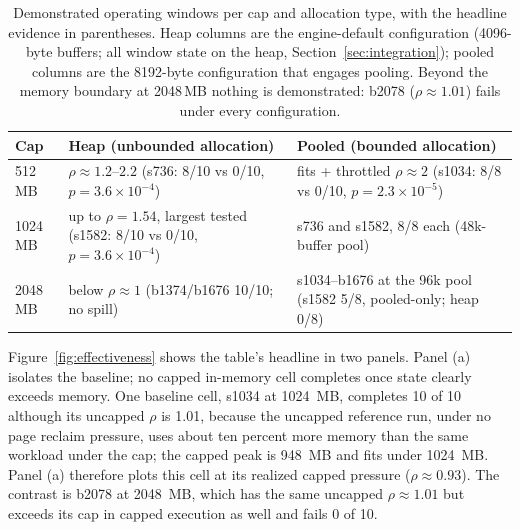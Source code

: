 \begin{table}[ht]
\centering
\small
\begin{tabular}{|p{1.5cm}|>{\raggedright\arraybackslash}p{5.1cm}|>{\raggedright\arraybackslash}p{5.1cm}|}
\hline
\textbf{Cap} & \textbf{Heap (unbounded allocation)} & \textbf{Pooled (bounded allocation)} \\
\hline
512\,MB  & $\rho \approx 1.2$--$2.2$ \newline (s736: 8/10 vs 0/10, $p=3.6\times10^{-4}$) & fits + throttled $\rho\approx2$ \newline (s1034: 8/8 vs 0/10, $p=2.3\times10^{-5}$) \\
\hline
1024\,MB & up to $\rho = 1.54$, largest tested \newline (s1582: 8/10 vs 0/10, $p=3.6\times10^{-4}$) & s736 and s1582, 8/8 each \newline (48k-buffer pool) \\
\hline
2048\,MB & below $\rho \approx 1$ \newline (b1374/b1676 10/10; no spill) & s1034--b1676 at the 96k pool \newline (s1582 5/8, pooled-only; heap 0/8) \\
\hline
\end{tabular}
\caption[Operating windows by cap and allocation type]{Demonstrated operating windows per cap and allocation type, with the
headline evidence in parentheses. Heap columns are the engine-default
configuration (4096-byte buffers; all window state on the heap,
Section~\ref{sec:integration}); pooled columns are the 8192-byte configuration
that engages pooling. Beyond the memory boundary at 2048\,MB nothing is
demonstrated: b2078 ($\rho \approx 1.01$) fails under every configuration.}
\label{tab:windows}
\end{table}

Figure~\ref{fig:effectiveness} shows the table's headline in two panels.
Panel (a) isolates the baseline; no capped in-memory cell completes once state clearly exceeds memory.
One baseline cell, s1034 at 1024\, MB, completes 10 of 10 although its uncapped $\rho$ is 1.01, because the uncapped reference run, under no page reclaim pressure, uses about ten percent more memory than the same workload under the cap; the capped peak is 948\, MB and fits under 1024\, MB.
Panel (a) therefore plots this cell at its realized capped pressure ($\rho \approx 0.93$).
The contrast is b2078 at 2048\, MB, which has the same uncapped $\rho \approx 1.01$ but exceeds its cap in capped execution as well and fails 0 of 10.

